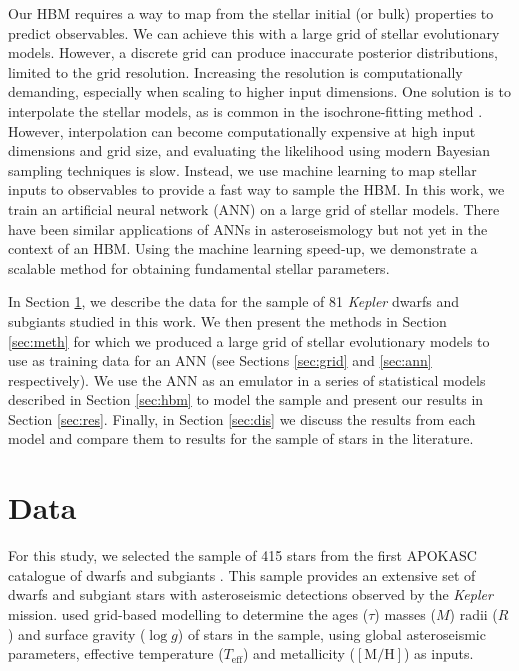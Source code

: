 \documentclass[a4paper,fleqn,usenatbib]{mnras}
\newcommand{\metallicity}{\ensuremath{[\mathrm{M}/\mathrm{H}]}}
\newcommand{\teff}{\ensuremath{T_\mathrm{eff}}}
\begin{document}
Our HBM requires a way to map from the stellar initial (or bulk) properties to predict observables. We can achieve this with a large grid of stellar evolutionary models. However, a discrete grid can produce inaccurate posterior distributions, limited to the grid resolution. Increasing the resolution is computationally demanding, especially when scaling to higher input dimensions. One solution is to interpolate the stellar models, as is common in the isochrone-fitting method \citep[see e.g.][]{Berger.Huber.ea2020}. However, interpolation can become computationally expensive at high input dimensions and grid size, and evaluating the likelihood using modern Bayesian sampling techniques is slow. Instead, we use machine learning to map stellar inputs to observables to provide a fast way to sample the HBM. In this work, we train an artificial neural network (ANN) on a large grid of stellar models. There have been similar applications of ANNs in asteroseismology \citep{Verma.Hanasoge.ea2016, Hendriks.Aerts2019} but not yet in the context of an HBM. Using the machine learning speed-up, we demonstrate a scalable method for obtaining fundamental stellar parameters.

In Section \ref{sec:data}, we describe the data for the sample of 81 \emph{Kepler} dwarfs and subgiants studied in this work. We then present the methods in Section \ref{sec:meth} for which we produced a large grid of stellar evolutionary models to use as training data for an ANN (see Sections \ref{sec:grid} and \ref{sec:ann} respectively). We use the ANN as an emulator in a series of statistical models described in Section \ref{sec:hbm} to model the sample and present our results in Section \ref{sec:res}. Finally, in Section \ref{sec:dis} we discuss the results from each model and compare them to results for the sample of stars in the literature.

\section{Data}\label{sec:data}

For this study, we selected the sample of 415 stars from the first APOKASC catalogue of dwarfs and subgiants \citep[][hereafter ]{Serenelli.Johnson.ea2017}. This sample provides an extensive set of dwarfs and subgiant stars with asteroseismic detections observed by the \emph{Kepler} mission.  used grid-based modelling to determine the ages ($\tau$) masses ($M$) radii ($R$) and surface gravity ($\log g$) of stars in the sample, using global asteroseismic parameters, effective temperature ($\teff$) and metallicity ($\metallicity$) as inputs. 
\end{document}
